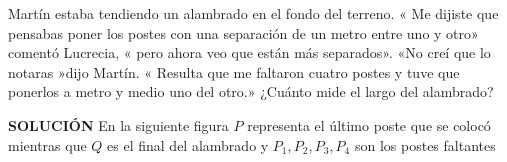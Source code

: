 \begin{excercise}
    Martín estaba tendiendo un alambrado en el fondo del terreno.
    « Me dijiste que pensabas poner los postes con una separación de un metro entre uno y otro» comentó Lucrecia, « pero ahora veo que están más separados».
    «No creí que lo notaras »dijo Martín. « Resulta que me faltaron cuatro postes y tuve que ponerlos a metro y medio uno del otro.»
    ¿Cuánto mide el largo del alambrado?
\end{excercise}

\textbf{SOLUCIÓN}
En la siguiente figura $P$ representa el último poste que se colocó mientras que $Q$ es el final del alambrado y $P_1, P_2, P_3, P_4$ son los postes faltantes

\begin{figure*}[ht!]
\end{figure*}

